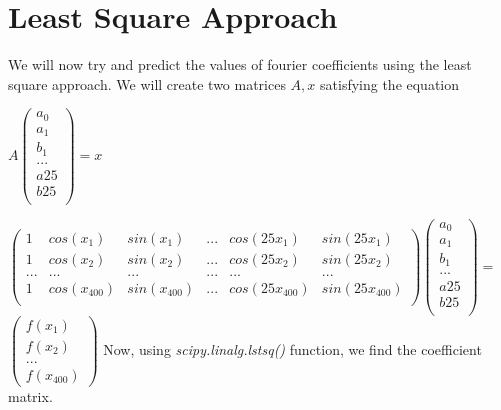 \documentclass[11pt, a4paper]{article}
\begin{document}
\section{Least Square Approach}
We will now try and predict the values of fourier coefficients using the least square approach. We will create two matrices $A,x$ satisfying the equation 
\begin{center}
    $A\begin{pmatrix}
    a_0\\
    a_1\\
    b_1\\
    ...\\
    a25\\
    b25\\
    \end{pmatrix} = x$ \\
\end{center}
    $\begin{pmatrix}
    1 & cos(x_1) & sin(x_1) & ... & cos(25x_1) & sin(25x_1) \\
    1 & cos(x_2) & sin(x_2) & ... & cos(25x_2) & sin(25x_2) \\
    ... & ... & ... & ... & ... & ...\\
    1 & cos(x_{400}) & sin(x_{400}) & ... & cos(25x_{400}) & sin(25x_{400}) \\
    \end{pmatrix}
    \begin{pmatrix}
    a_0\\
    a_1\\
    b_1\\
    ...\\
    a25\\
    b25\\
    \end{pmatrix} =$
    $\begin{pmatrix}
    f(x_1)\\
    f(x_2)\\
    ...\\
    f(x_{400})
    \end{pmatrix} $\newline
Now, using \emph{scipy.linalg.lstsq()} function, we find the coefficient matrix.\newline
\end{document}
